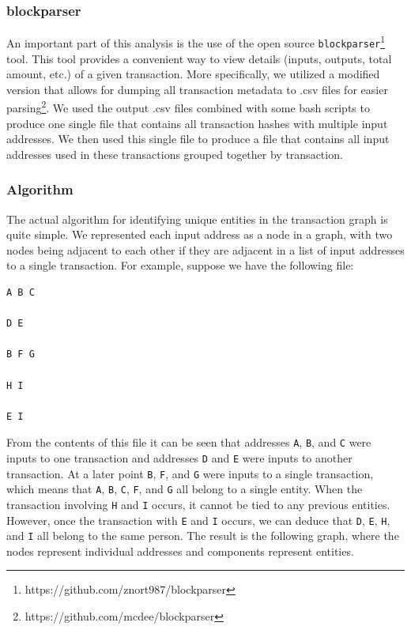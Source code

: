 \documentclass[11pt]{article}
\begin{document}
\subsubsection{blockparser}
An important part of this analysis is the use of the open source \texttt{blockparser}\footnote{https://github.com/znort987/blockparser} tool. This tool provides a convenient way to view details (inputs,
outputs, total amount, etc.) of a given transaction. More specifically, we utilized a modified version that allows for
dumping all transaction metadata to .csv files for easier parsing\footnote{https://github.com/mcdee/blockparser}. We
used the output .csv files combined with some bash scripts to produce one single file that contains all transaction
hashes with multiple input addresses. We then used this single file to produce a file that contains all input addresses
used in these transactions grouped together by transaction.

\subsubsection{Algorithm}
The actual algorithm for identifying unique entities in the transaction graph is quite simple.
We represented each input address as a node in a graph, with two nodes being adjacent to each other if they are adjacent
in a list of input addresses to a single transaction. For example, suppose we have the following file:
\begin{verbatim}
A B C

D E

B F G

H I

E I
\end{verbatim}

From the contents of this file it can be seen that addresses \texttt{A}, \texttt{B}, and \texttt{C} were inputs to one
transaction and addresses \texttt{D} and \texttt{E} were inputs to another transaction. At a later point \texttt{B},
\texttt{F}, and \texttt{G} were inputs to a single transaction, which means that \texttt{A}, \texttt{B}, \texttt{C},
\texttt{F}, and \texttt{G} all belong to a single entity. When the transaction involving \texttt{H} and \texttt{I}
occurs, it cannot be tied to any previous entities. However, once the transaction with \texttt{E} and \texttt{I} occurs,
we can deduce that \texttt{D}, \texttt{E}, \texttt{H}, and \texttt{I} all belong to the same person. The result is the
following graph, where the nodes represent individual addresses and components represent entities.
\end{document}
